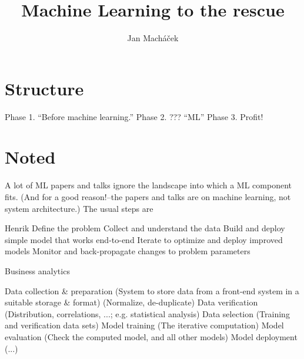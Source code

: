 \documentclass[10 pt, twocolumn]{article}
\title{Machine Learning to the rescue}
\author{Jan Macháček}
\begin{document}

\section{Structure}
Phase 1. ``Before machine learning.''
Phase 2. ??? ``ML''
Phase 3. Profit!

\section{Noted}
A lot of ML papers and talks ignore the landscape into which a ML component fits. (And for a good reason!--the papers and talks are on machine learning, not system architecture.) The usual steps are

Henrik\cite{goto-2017}
Define the problem
Collect and understand the data
Build and deploy simple model that works end-to-end
Iterate to optimize and deploy improved models
Monitor and back-propagate changes to problem parameters

Business analytics

Data collection \& preparation
  (System to store data from a front-end system in a suitable storage \& format)
  (Normalize, de-duplicate)
Data verification 
  (Distribution, correlations, ...; e.g. statistical analysis)
Data selection
  (Training and verification data sets)
Model training
  (The iterative computation)
Model evaluation
  (Check the computed model, and all other models)
Model deployment
  (...)
\end{document}
